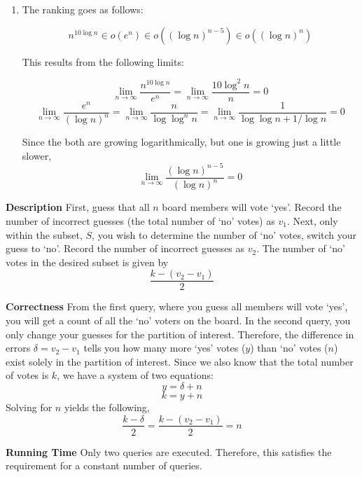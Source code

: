 \documentclass[12pt,twoside]{article}
\begin{document}
\begin{problems}
\begin{problemparts}
\begin{enumerate}
    \item The ranking goes as follows:
    
    $$ n^{10 \log n} \in o(e^n) \in o\left((\log n)^{n - 5}\right) \in 
    o\left((\log n)^n\right) $$
    
    This results from the following limits:
    
    $$\lim_{n \to \infty} \frac{n^{10 \log n}}{e^n} = \lim_{n \to \infty} \frac{10 
        \log^2 n}{n} = 0 $$
    $$\lim_{n \to \infty} \frac{e^n}{\left(\log n\right)^{n}} = \lim_{n \to \infty}
        \frac{n}{\log\log^n n} = \lim_{n \to \infty} \frac{1}{\log\log n + 1 / \log n} = 0 $$
    
    Since the both are growing logarithmically, but one is growing just a little slower,
    $$\lim_{n \to \infty} \frac{\left(\log n\right)^{n - 5}}{\left(\log n \right)^n} = 0 $$
    
  \end{enumerate}

\end{problemparts}

\newpage
\problem  %

\begin{problemparts}

\problempart %

\textbf{Description} First, guess that all $n$ board members will vote `yes'. 
Record the number of incorrect guesses (the total number of `no' votes) as $v_1$.
Next, only within the subset, $S$, you wish to determine the number of `no'
votes, switch your guess to `no'. Record the number of incorrect guesses as 
$v_2$. The number of `no' votes in the desired subset is given by
$$ \frac{k - (v_2 - v_1)}{2} $$

\textbf{Correctness} From the first query, where you guess all members will vote
`yes', you will get a count of all the `no' voters on the board. In the second
query, you only change your guesses for the partition of interest. Therefore,
the difference in errors $\delta = v_2 - v_1$ tells you how many more `yes' 
votes ($y$) than `no' votes ($n$) exist solely in the partition of interest. 
Since we also know that the total number of votes is $k$, we have a system of 
two equations:
$$ y = \delta + n $$
$$ k = y + n $$
Solving for $n$ yields the following,
$$ \frac{k - \delta}{2} = \frac{k - (v_2 - v_1)}{2} = n $$

\textbf{Running Time} Only two queries are executed. Therefore, this satisfies
the requirement for a constant number of queries.


\end{problemparts}
\end{problems}
\end{document}
